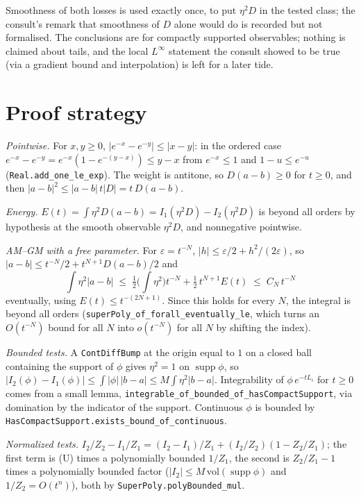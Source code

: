 \documentclass[11pt]{article}
\newcommand{\code}[1]{\texttt{#1}}
\begin{document}
Smoothness of both losses is used exactly once, to put $\eta^2 D$ in the
tested class; the consult's remark that smoothness of $D$ alone would
do is recorded but not formalised. The conclusions are for compactly
supported observables; nothing is claimed about tails, and the local
$L^\infty$ statement the consult showed to be true (via a gradient
bound and interpolation) is left for a later tide.

\section{Proof strategy}

\emph{Pointwise.} For $x, y \ge 0$, $|e^{-x} - e^{-y}| \le |x - y|$:
in the ordered case $e^{-x} - e^{-y} = e^{-x}(1 - e^{-(y-x)}) \le
y - x$ from $e^{-x} \le 1$ and $1 - u \le e^{-u}$
(\code{Real.add\_one\_le\_exp}). The weight is antitone, so $D(a - b)
\ge 0$ for $t \ge 0$, and then $|a - b|^2 \le |a - b|\,t|D| = t\,D(a - b)$.

\emph{Energy.} $E(t) = \int\eta^2 D(a - b) = I_1(\eta^2 D) -
I_2(\eta^2 D)$ is beyond all orders by hypothesis at the smooth
observable $\eta^2 D$, and nonnegative pointwise.

\emph{AM--GM with a free parameter.} For $\varepsilon = t^{-N}$,
$|h| \le \varepsilon/2 + h^2/(2\varepsilon)$, so $|a - b| \le t^{-N}/2 +
t^{N+1} D(a - b)/2$ and
\[
\int\eta^2|a - b| \;\le\; \tfrac12\Big(\int\eta^2\Big)t^{-N} +
\tfrac12\,t^{N+1}E(t) \;\le\; C_N\,t^{-N}
\]
eventually, using $E(t) \le t^{-(2N+1)}$. Since this holds for every
$N$, the integral is beyond all orders
(\code{superPoly\_of\_forall\_eventually\_le}, which turns an $O(t^{-N})$
bound for all $N$ into $o(t^{-N})$ for all $N$ by shifting the index).

\emph{Bounded tests.} A \code{ContDiffBump} at the origin equal to $1$
on a closed ball containing the support of $\phi$ gives $\eta^2 = 1$ on
$\operatorname{supp}\phi$, so $|I_2(\phi) - I_1(\phi)| \le \int|\phi|\,
|b - a| \le M\int\eta^2|b - a|$. Integrability of $\phi\,e^{-tL_i}$ for
$t \ge 0$ comes from a small lemma,
\code{integrable\_of\_bounded\_of\_hasCompactSupport}, via domination by
the indicator of the support. Continuous $\phi$ is bounded by
\code{HasCompactSupport.exists\_bound\_of\_continuous}.

\emph{Normalized tests.} $I_2/Z_2 - I_1/Z_1 = (I_2 - I_1)/Z_1 +
(I_2/Z_2)(1 - Z_2/Z_1)$; the first term is (U) times a polynomially
bounded $1/Z_1$, the second is $Z_2/Z_1 - 1$ times a polynomially bounded
factor ($|I_2| \le M\,\mathrm{vol}(\operatorname{supp}\phi)$ and $1/Z_2
= O(t^n)$), both by \code{SuperPoly.polyBounded\_mul}.
\end{document}
